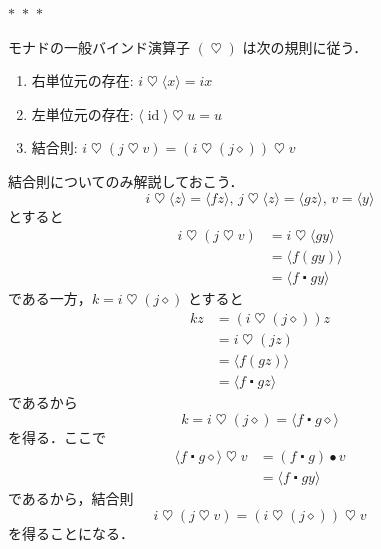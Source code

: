 \documentclass[a4paper,twocolumn]{jsbook}
\newcommand{\separator}{\begin{center}$*$~$*$~$*$\end{center}}
\newcommand{\mAnonParam}{\diamond}
\DeclareMathOperator{\mId}{id}
\DeclareMathOperator{\mBind}{\heartsuit}
\DeclareMathOperator{\mComp}{\centerdot}
\DeclareMathOperator{\mMap}{\bullet}
\newcommand{\mPureWith}[1]{\langle#1\rangle}
\begin{document}
\separator

モナドの一般バインド演算子 $(\mBind)$ は次の規則に従う．
\begin{enumerate}
\item 右単位元の存在: $i\mBind{}\mPureWith{x}=ix$
\item 左単位元の存在: $\mPureWith{\mId}\mBind u=u$
\item 結合則: $i\mBind{}(j\mBind v)=(i\mBind{}(j\mAnonParam))\mBind v$
\end{enumerate}

結合則についてのみ解説しておこう．
\begin{equation}
i\mBind\mPureWith{z}=\mPureWith{fz},\,
j\mBind\mPureWith{z}=\mPureWith{gz},\,
v=\mPureWith{y}
\end{equation}
とすると
\begin{align}
i\mBind(j\mBind v)&=i\mBind\mPureWith{gy}\\
&=\mPureWith{f(gy)}\\
&=\mPureWith{f\mComp gy}
\end{align}
である一方，$k=i\mBind{}(j\mAnonParam)$ とすると
\begin{align}
kz&=(i\mBind(j\mAnonParam))z\\
&=i\mBind(jz)\\
&=\mPureWith{f(gz)}\\
&=\mPureWith{f\mComp gz}
\end{align}
であるから
\begin{equation}
k=i\mBind{}(j\mAnonParam)=\mPureWith{f\mComp g\mAnonParam}
\end{equation}
を得る．ここで
\begin{align}
\mPureWith{f\mComp g\mAnonParam}\mBind v
&=(f\mComp g)\mMap v\\
&=\mPureWith{f\mComp gy}
\end{align}
であるから，結合則
\begin{equation}
i\mBind{}(j\mBind v)=(i\mBind{}(j\mAnonParam))\mBind v
\end{equation}
を得ることになる．
\end{document}
